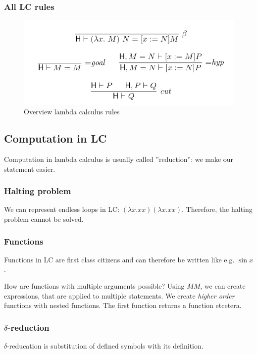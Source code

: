 \subsubsection{All LC rules}

\begin{figure}[H]
\centering
\includegraphics[width=0.7\linewidth]{images/lc_rules}
\caption{Overview lambda calculus rules}
\label{fig:lcrules}
\end{figure}


\subsection{Computation in LC}
Computation in lambda calculus is usually called ''reduction'': we make our statement easier.

\subsubsection{Halting problem}

We can represent endless loops in LC: $(\lambda x. x x) (\lambda x . x x)$. Therefore, the halting problem cannot be solved.

\subsubsection{Functions}

Functions in LC are first class citizens and can therefore be written like e.g. $\sin x$.

How are functions with multiple arguments possible? Using $M M$, we can create expressions, that are applied to multiple statements. We create \emph{higher order} functions with nested functions. The first function returns a function etcetera.



\subsubsection{$\delta$-reduction}
$\delta$-reducation is substitution of defined symbols with its definition.

